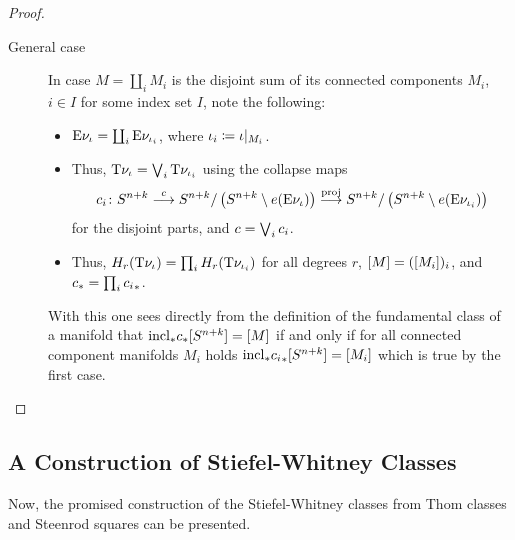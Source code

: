 \begin{Lem}
\begin{proof}
\begin{description}
    \item[General case] In case $M=\coprod_i M_i$ is the disjoint sum of its connected
      components $M_i$, $i\in I$ for some index set $I$, note the following:
      \begin{itemize}
      \item $\mathrm{E}\nu_{{\iota}} = \coprod_i\mathrm{E}\nu_{{\iota}_i}$,
        where ${\iota}_i\coloneqq{\iota}|_{M_i}$.
      \item Thus, $\mathrm{T}{\nu_{{\iota}}} = \bigvee_i\mathrm{T}{\nu_{{\iota}_i}}$ using the
        collapse maps
        \begin{gather*}
          c_i\colon
          S^{n+k}
          \overset{c}{\longrightarrow}
          S^{n+k}/\left(S^{n+k}\setminus e(\mathrm{E}\nu_{{\iota}})\right)
          \overset{\mathrm{proj}}{\longrightarrow}
          S^{n+k}/\left(S^{n+k}\setminus e(\mathrm{E}\nu_{{\iota}_i})\right)
        \end{gather*}
        for the disjoint parts,
        and $c=\bigvee_ic_i$.
      \item Thus, $H_r(\mathrm{T}{\nu_{{\iota}}}) = \prod_i H_r(\mathrm{T}{\nu_{{\iota}_i}})$ for
        all degrees $r$, $[M] = ([M_i])_i$, and
        ${c}_* = \prod_i{c_i}_*$.
      \end{itemize}
      With this one sees directly from the definition of the fundamental
      class of a manifold that
      ${\mathrm{incl}}_*{c}_*[S^{n+k}] = [M]$
      if and only if for all connected component manifolds $M_i$ holds
      ${\mathrm{incl}}_*{c_i}_*[S^{n+k}] = [M_i]$
      which is true by the first case.
      \qedhere
    \end{description}
  \end{proof}
\end{Lem}

\subsection{A Construction of Stiefel-Whitney Classes}
\label{sec:swclsconstruction}
Now, the promised construction of the Stiefel-Whitney classes from
Thom classes and Steenrod squares can be presented.

